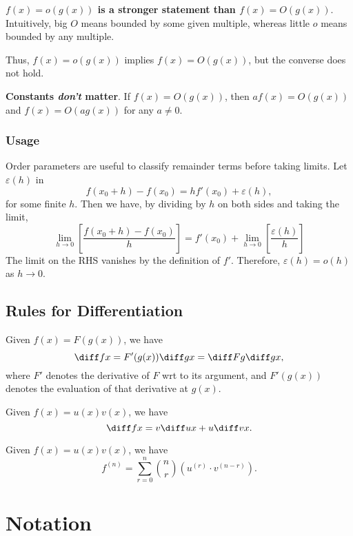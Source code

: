 \documentclass[12pt]{article}
\begin{document}
\textbf{$f(x) = o(g(x))$ is a stronger statement than $f(x) = O(g(x))$}.
Intuitively, big $O$ means bounded by some given multiple,
whereas little $o$ means bounded by any multiple.

Thus, $f(x) = o(g(x))$ implies $f(x) = O(g(x))$,
but the converse does not hold.

\textbf{Constants \emph{don't} matter}. 
If $f(x) = O(g(x))$, then $af(x) = O(g(x))$ and $f(x) = O(ag(x))$
for any $a \ne 0$.

\subsubsection*{Usage}

Order parameters are useful to classify remainder terms before taking limits.
Let $\varepsilon (h)$ in
\[
f(x_{0}+h) - f(x_{0}) = hf'(x_0) + \varepsilon (h),
\]
for some finite $h$. Then we have,
by dividing by $h$ on both sides and taking the limit,
\[
\lim\limits_{h \to 0}\left[\frac{f(x_{0}+h)-f(x_{0})}{h}\right]
= f'(x_{0}) + \lim\limits_{h \to 0}\left[\frac{\varepsilon (h)}{h}\right]
\]
The limit on the RHS vanishes by the definition of $f'$.
Therefore, $\varepsilon (h) = o(h)$ as $h \to 0$.

\newpage
\subsection{Rules for Differentiation}

\begin{theorem}
    Given $f(x) = F(g(x))$, we have
    \[
    \diff f x = F'(g(x)) \diff gx = \diff Fg \diff gx,
    \]
    where $F'$ denotes the derivative of $F$ wrt to its argument,
    and $F'(g(x))$ denotes the evaluation of that derivative at $g(x)$.
\end{theorem}

\begin{theorem}
    Given $f(x) = u(x)v(x)$, we have
    \[
    \diff f x = v \diff ux + u \diff vx.
    \]
\end{theorem}

\begin{theorem}
    Given $f(x) = u(x)v(x)$, we have
    \[
    f^{(n)} = \sum\limits_{r=0}^{n}\binom nr \left(u^{(r)} \cdot v^{(n-r)}\right).
    \]
\end{theorem}

\appendix

\newpage
\section{Notation}
\end{document}
